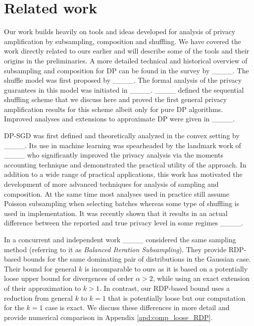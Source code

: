 \section{Related work}
Our work builds heavily on tools and ideas developed for analysis of privacy amplification by subsampling, composition and shuffling. We have covered the work directly related to ours earlier and will describe some of the tools and their origins in the preliminaries. A more detailed technical and historical overview of subsampling and composition for DP can be found in the survey by ____.  The shuffle model was first proposed by ____. The formal analysis of the privacy guarantees in this model was initiated in ____.  ____ defined the sequential shuffling scheme that we discuss here and proved the first general privacy amplification results for this scheme albeit only for pure DP algorithms. Improved analyses and extensions to approximate DP were given in ____.

DP-SGD was first defined and theoretically analyzed in the convex setting by ____. Its use in machine learning was spearheaded by the landmark work of 
____ who significantly improved the privacy analysis via the moments accounting technique and demonstrated the practical utility of the approach. In addition to a wide range of practical applications, this work  has motivated the development of more advanced techniques for analysis of sampling and composition. At the same time most analyses used in practice still assume Poisson subsampling when selecting batches whereas some type of shuffling is used in implementation. It was recently shown that it results in an actual difference between the reported and true privacy level in some regimes ____.

In a concurrent and independent work ____ considered the same sampling method (referring to it as \emph{Balanced Iteration Subsampling}). They provide RDP-based bounds for the same dominating pair of distributions in the Gaussian case. 
 Their bound for general $k$ is incomparable to ours as it is based on a potentially loose upper bound for divergences of order $\alpha > 2$, while using an exact extension of their approximation to $k > 1$. In contrast, our RDP-based bound uses a reduction from general $k$ to $k=1$ that is potentially loose but our computation for the $k=1$ case is exact. We discuss these differences in more detail and provide numerical comparison in Appendix \ref{apd:comp_loose_RDP}.


